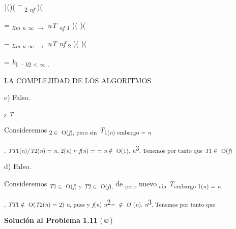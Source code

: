 \documentclass[12pt]{article}
\renewcommand{\_}{\kern-1.5pt\textunderscore\kern-1.5pt}
\begin{document}
\begin{Center}
)()( \textsuperscript{$-$  }\textsubscript{2 \textit{nf }})( 
\end{Center}\par

\begin{FlushRight}
= \textit{\textsubscript{lim n }}\textsubscript{$\infty$ $ \rightarrow $  }\textit{nT \textsubscript{nf }}\textsubscript{1 })( )( 
\end{FlushRight}\par

\begin{FlushRight}
$-$  \textit{\textsubscript{lim n }}\textsubscript{$\infty$ $ \rightarrow $  }\textit{nT nf }\textsubscript{2 })( )( 
\end{FlushRight}\par

{\fontsize{10pt}{12.0pt}\selectfont = \textit{k}\textsubscript{1 \textit{– k}2 < $\infty$ . }\par}\par

{\fontsize{7pt}{8.4pt}\selectfont LA COMPLEJIDAD DE LOS ALGORITMOS {\fontsize{10pt}{12.0pt} \par}\par}\par

{\fontsize{10pt}{12.0pt}\selectfont c) Falso. \par}\par

\textsubscript{y \textit{T}}{\fontsize{10pt}{12.0pt}\selectfont Consideremos \textsubscript{2$ \in $ O(\textit{f}), pero sin }\textit{T}\textsubscript{1(\textit{n}) embargo = \textit{n}}{\fontsize{7pt}{8.4pt}\textsubscript{, \textit{TT}1(\textit{n})/\textit{T}2(\textit{n}) = \textit{n}, 2(\textit{n}) y \textit{f}(\textit{n}) = = \textit{n}$ \notin $ O(1). \textit{n}}3\textsubscript{. Tenemos por tanto que \textit{T}1$ \in $ O(\textit{f}) }{\fontsize{10pt}{12.0pt}\selectfont d) Falso. \par}\par}\par}\par

{\fontsize{10pt}{12.0pt}\selectfont Consideremos \textit{\textsubscript{T}}\textsubscript{1$ \in $ O(\textit{f}) y \textit{T}2$ \in $ O(\textit{f}), }de \textsubscript{pero }nuevo \textsubscript{sin }\textit{T}\textsubscript{embargo 1(\textit{n}) = \textit{n}}{\fontsize{7pt}{8.4pt}\textsubscript{, \textit{TT}1$ \notin $ O(\textit{T}2(\textit{n}) = 2) \textit{n}, pues y \textit{f}(\textit{n}) \textit{n}}2\textsubscript{= $ \notin $ $O$ (\textit{n}). \textit{n}}3\textsubscript{. Tenemos por tanto que }{\fontsize{10pt}{12.0pt}\selectfont \textbf{Solución al Problema 1.11 }(☺) \par}\par}\par}\par
\end{document}
